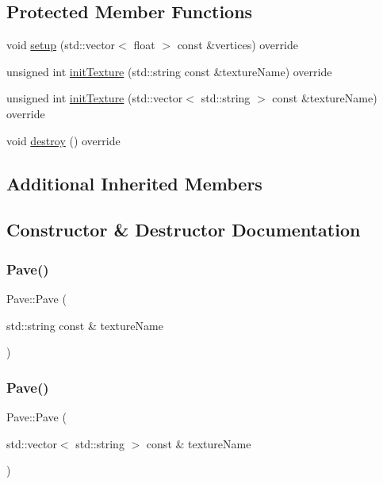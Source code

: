 \subsection*{Protected Member Functions}
\begin{DoxyCompactItemize}
\item 
void \hyperlink{classPave_a1e3cc420288e7e704891cdfc2cada962}{setup} (std\+::vector$<$ float $>$ const \&vertices) override
\item 
unsigned int \hyperlink{classPave_ae3deef5b3908954e34944051f00fea39}{init\+Texture} (std\+::string const \&texture\+Name) override
\item 
unsigned int \hyperlink{classPave_a00f96f2cd410ebc8d95ebc482f79f966}{init\+Texture} (std\+::vector$<$ std\+::string $>$ const \&texture\+Name) override
\item 
void \hyperlink{classPave_a1600213efbebd71a3612bb6812ac463b}{destroy} () override
\end{DoxyCompactItemize}
\subsection*{Additional Inherited Members}


\subsection{Constructor \& Destructor Documentation}
\mbox{\label{classPave_a7537278f91075d65387b8fdb5bed3670}} 
\subsubsection{\texorpdfstring{Pave()}{Pave()}\hspace{0.1cm}{\footnotesize\ttfamily [1/2]}}
{\footnotesize\ttfamily Pave\+::\+Pave (\begin{DoxyParamCaption}\item[{std\+::string const \&}]{texture\+Name }\end{DoxyParamCaption})}

\mbox{\label{classPave_a78c2b5d920edf472b6f80b914a98b497}} 
\subsubsection{\texorpdfstring{Pave()}{Pave()}\hspace{0.1cm}{\footnotesize\ttfamily [2/2]}}
{\footnotesize\ttfamily Pave\+::\+Pave (\begin{DoxyParamCaption}\item[{std\+::vector$<$ std\+::string $>$ const \&}]{texture\+Name }\end{DoxyParamCaption})}

